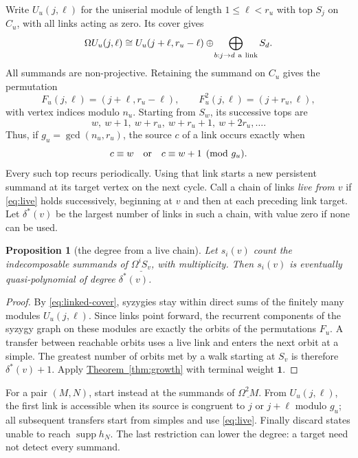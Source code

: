 \documentclass[reqno]{amsart}
\numberwithin{equation}{section}
\newtheorem{proposition}[theorem]{Proposition}
\theoremstyle{definition}
\theoremstyle{remark}
\newcommand{\Om}{\Omega}
\newcommand{\onevec}{\mathbf1}
\newcommand{\thmref}[1]{\hyperref[#1]{Theorem~\ref*{#1}}}
\begin{document}
Write \(U_u(j,\ell)\) for the uniserial module of length \(1\le\ell<r_u\) with top \(S_j\) on \(C_u\), with all links acting as zero. Its cover gives
\begin{equation}\label{eq:linked-cover}
 \Om U_u(j,\ell)\cong U_u(j+\ell,r_u-\ell)
       \oplus\!\bigoplus_{b:j\to d\ {\rm a\ link}}S_d.
\end{equation}
All summands are non-projective. Retaining the summand on \(C_u\) gives the permutation
\[
 F_u(j,\ell)=(j+\ell,r_u-\ell),\qquad F_u^2(j,\ell)=(j+r_u,\ell),
\]
with vertex indices modulo \(n_u\). Starting from \(S_w\), its successive tops are
\[
w,\ w+1,\ w+r_u,\ w+r_u+1,\ w+2r_u,\ldots.
\]
Thus, if \(g_u=\gcd(n_u,r_u)\), the source \(c\) of a link occurs exactly when
\begin{equation}\label{eq:live}
 c\equiv w\quad\hbox{or}\quad c\equiv w+1\pmod{g_u}.
\end{equation}
Every such top recurs periodically. Using that link starts a new persistent summand at its target vertex on the next cycle. Call a chain of links \emph{live from \(v\)} if \eqref{eq:live} holds successively, beginning at \(v\) and then at each preceding link target. Let \(\delta^*(v)\) be the largest number of links in such a chain, with value zero if none can be used.

\begin{proposition}[the degree from a live chain]\label{prop:linked}
Let \(s_i(v)\) count the indecomposable summands of \(\underline{\Om^iS_v}\), with multiplicity. Then \(s_i(v)\) is eventually quasi-polynomial of degree \(\delta^*(v)\).
\end{proposition}
\begin{proof}
By \eqref{eq:linked-cover}, syzygies stay within direct sums of the finitely many modules \(U_u(j,\ell)\). Since links point forward, the recurrent components of the syzygy graph on these modules are exactly the orbits of the permutations \(F_u\). A transfer between reachable orbits uses a live link and enters the next orbit at a simple. The greatest number of orbits met by a walk starting at \(S_v\) is therefore \(\delta^*(v)+1\). Apply \thmref{thm:growth} with terminal weight \(\onevec\).
\end{proof}

For a pair \((M,N)\), start instead at the summands of \(\underline{\Om^2M}\). From \(U_u(j,\ell)\), the first link is accessible when its source is congruent to \(j\) or \(j+\ell\) modulo \(g_u\); all subsequent transfers start from simples and use \eqref{eq:live}. Finally discard states unable to reach \(\operatorname{supp}h_N\). The last restriction can lower the degree: a target need not detect every summand.
\end{document}
